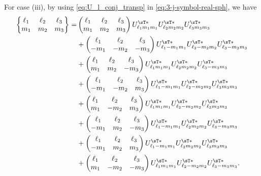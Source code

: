 For case (iii), by using \eqref{eq:U_l_conj_transp} in \eqref{eq:3-j-symbol-real-sph}, we have
\begin{equation}
\begin{aligned}
    \begin{Bmatrix}
        \ell_1 & \ell_2 & \ell_3 \\ m_1 & m_2 & m_3
    \end{Bmatrix}
    =&
    \begin{pmatrix}
        \ell_1 & \ell_2 & \ell_3 \\ m_1 & m_2 & m_3
    \end{pmatrix}
    U^{\sT\ast}_{\ell_1 m_1m_1} U^{\sT\ast}_{\ell_2 m_2m_2} U^{\sT\ast}_{\ell_3 m_3m_3} \\
    &+
    \begin{pmatrix}
        \ell_1 & \ell_2 & \ell_3 \\ -m_1 & -m_2 & -m_3
    \end{pmatrix}
    U^{\sT\ast}_{\ell_1 -m_1m_1} U^{\sT\ast}_{\ell_2 -m_2m_2} U^{\sT\ast}_{\ell_3 -m_3m_3} \\
    &+
    \begin{pmatrix}
        \ell_1 & \ell_2 & \ell_3 \\ m_1 & m_2 & -m_3
    \end{pmatrix}
    U^{\sT\ast}_{\ell_1 m_1m_1} U^{\sT\ast}_{\ell_2 m_2m_2} U^{\sT\ast}_{\ell_3 -m_3m_3} \\
    &+
    \begin{pmatrix}
        \ell_1 & \ell_2 & \ell_3 \\ -m_1 & -m_2 & m_3
    \end{pmatrix}
    U^{\sT\ast}_{\ell_1 -m_1m_1} U^{\sT\ast}_{\ell_2 -m_2m_2} U^{\sT\ast}_{\ell_3 m_3m_3} \\
    &+
    \begin{pmatrix}
        \ell_1 & \ell_2 & \ell_3 \\ m_1 & -m_2 & m_3
    \end{pmatrix}
    U^{\sT\ast}_{\ell_1 m_1m_1} U^{\sT\ast}_{\ell_2 -m_2m_2} U^{\sT\ast}_{\ell_3 m_3m_3} \\
    &+
    \begin{pmatrix}
        \ell_1 & \ell_2 & \ell_3 \\ -m_1 & m_2 & -m_3
    \end{pmatrix}
    U^{\sT\ast}_{\ell_1 -m_1m_1} U^{\sT\ast}_{\ell_2 m_2m_2} U^{\sT\ast}_{\ell_3 -m_3m_3} \\
    &+
    \begin{pmatrix}
        \ell_1 & \ell_2 & \ell_3 \\ -m_1 & m_2 & m_3
    \end{pmatrix}
    U^{\sT\ast}_{\ell_1 -m_1m_1} U^{\sT\ast}_{\ell_2 m_2m_2} U^{\sT\ast}_{\ell_3 m_3m_3} \\
    &+
    \begin{pmatrix}
        \ell_1 & \ell_2 & \ell_3 \\ m_1 & -m_2 & -m_3
    \end{pmatrix}
    U^{\sT\ast}_{\ell_1 m_1m_1} U^{\sT\ast}_{\ell_2 -m_2m_2} U^{\sT\ast}_{\ell_3 -m_3m_3}
    .
\end{aligned}
\end{equation}
